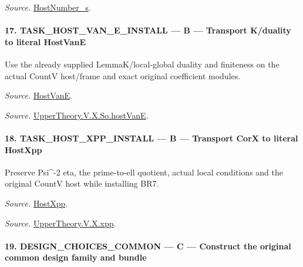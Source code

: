 \emph{Source.} \href{https://github.com/CocoSgt/riemann-hypothesis-lean/blob/7cbf7a0c32fca1badf05931879a37c3f8a2b03b4/src/Development/AutomorphicArithmetic/AutomorphicVarieties/ModularityArgument/ThresholdArguments/DenseThresholdCases/HostNumberS.lean#L18-L28}{HostNumber\_\allowbreak s}.



\paragraph{17. TASK\_\allowbreak HOST\_\allowbreak VAN\_\allowbreak E\_\allowbreak INSTALL — B — Transport K/duality to literal HostVanE}

Use the already supplied LemmaK/local-global duality and finiteness on the actual CountV host/frame and exact original coefficient modules.

\emph{Source.} \href{https://github.com/CocoSgt/riemann-hypothesis-lean/blob/7cbf7a0c32fca1badf05931879a37c3f8a2b03b4/src/Development/AutomorphicArithmetic/AutomorphicVarieties/UnitaryThreeDeformations/HostNumber.lean#L9-L12}{HostVanE}.

\emph{Source.} \href{https://github.com/CocoSgt/riemann-hypothesis-lean/blob/7cbf7a0c32fca1badf05931879a37c3f8a2b03b4/src/Development/AutomorphicArithmetic/AutomorphicVarieties/LevelCohomology/SoHostVanE.lean#L11-L18}{UpperTheory.V.X.So.hostVanE}.



\paragraph{18. TASK\_\allowbreak HOST\_\allowbreak XPP\_\allowbreak INSTALL — B — Transport CorX to literal HostXpp}

Preserve Psi\textasciicircum{}-2 eta, the prime-to-ell quotient, actual local conditions and the original CountV host while installing BR7.

\emph{Source.} \href{https://github.com/CocoSgt/riemann-hypothesis-lean/blob/7cbf7a0c32fca1badf05931879a37c3f8a2b03b4/src/Development/AutomorphicArithmetic/AutomorphicVarieties/UnitaryThreeDeformations/HostNumber.lean#L14-L17}{HostXpp}.

\emph{Source.} \href{https://github.com/CocoSgt/riemann-hypothesis-lean/blob/7cbf7a0c32fca1badf05931879a37c3f8a2b03b4/src/Development/AutomorphicArithmetic/AutomorphicVarieties/LevelCohomology/Xpp.lean#L11-L84}{UpperTheory.V.X.xpp}.



\paragraph{19. DESIGN\_\allowbreak CHOICES\_\allowbreak COMMON — C — Construct the original common design family and bundle}

